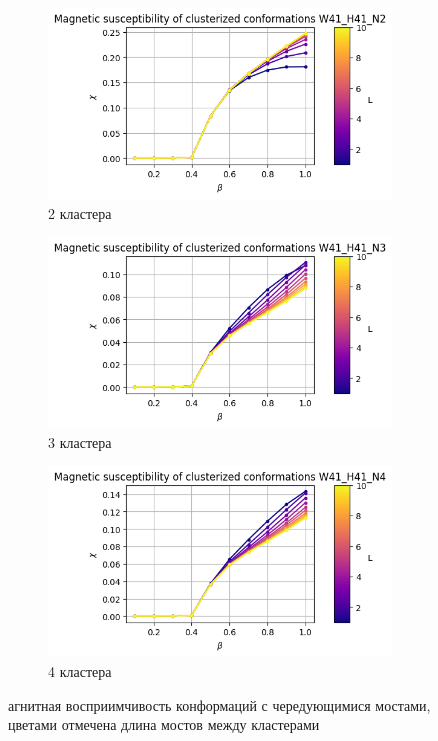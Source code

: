 \documentclass[14pt]{extarticle}
\begin{document}
\begin{figure}[ht]
	\centering
    \begin{subfigure}[t]{0.3\textwidth}
        \includegraphics*[width=\textwidth]{../images/magnetic_susceptibility/clusterized_W41_H41_N2.png}
        \caption*{2 кластера}
    \end{subfigure}
    \begin{subfigure}[t]{0.3\textwidth}
        \includegraphics*[width=\textwidth]{../images/magnetic_susceptibility/clusterized_W41_H41_N3.png}
        \caption*{3 кластера}
    \end{subfigure}
    \begin{subfigure}[t]{0.3\textwidth}
        \includegraphics*[width=\textwidth]{../images/magnetic_susceptibility/clusterized_W41_H41_N4.png}
        \caption*{4 кластера}
    \end{subfigure}
	\caption{агнитная восприимчивость конформаций с чередующимися мостами, цветами отмечена длина мостов между кластерами}
	\label{fig:cluster_ud_magnetc_sus}
\end{figure}
\end{document}
